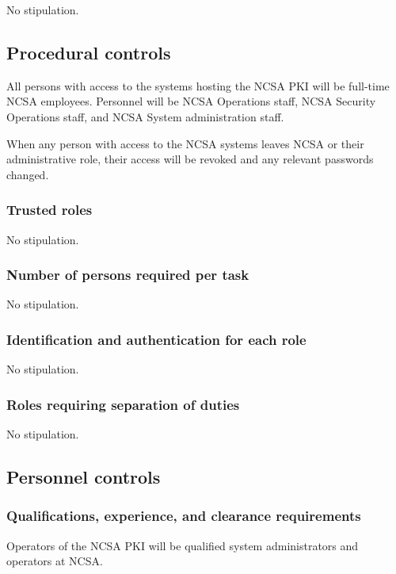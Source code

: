 \documentclass[10pt]{article}
\begin{document}
No stipulation.

\subsection{Procedural controls}

All persons with access to the systems hosting the NCSA PKI will  be
full-time NCSA employees. Personnel will be NCSA Operations staff,
NCSA Security Operations staff, and NCSA System administration staff. 

 When any person with access to the NCSA
systems leaves NCSA or their administrative role, their access will be
revoked and any relevant passwords changed.

\subsubsection{Trusted roles}

No stipulation.

\subsubsection{Number of persons required per task}

No stipulation.

\subsubsection{Identification and authentication for each role}

No stipulation.

\subsubsection{Roles requiring separation of duties}

No stipulation.

\subsection{Personnel controls}

\subsubsection{Qualifications, experience, and clearance requirements}

Operators of the NCSA PKI will be qualified system administrators and
operators at NCSA.
\end{document}
